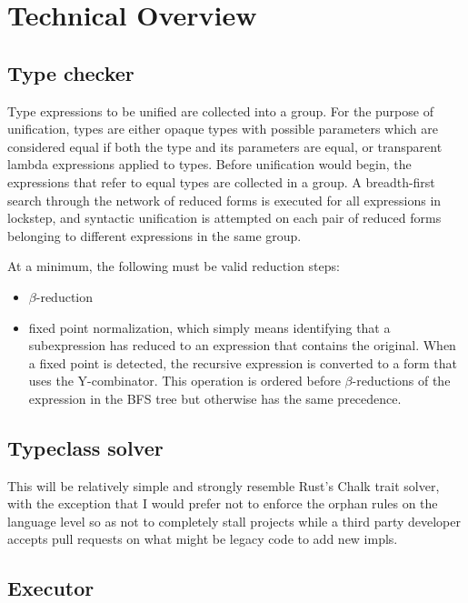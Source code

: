 \documentclass{article}
\begin{document}
\section{Technical Overview}

\subsection{Type checker}

Type expressions to be unified are collected into a group. For the purpose of unification, types
are either opaque types with possible parameters which are considered equal if both the type and its
parameters are equal, or transparent lambda expressions applied to types. Before unification would
begin, the expressions that refer to equal types are collected in a group. A breadth-first search
through the network of reduced forms is executed for all expressions in lockstep, and
syntactic unification is attempted on each pair of reduced forms belonging to different expressions
in the same group.

At a minimum, the following must be valid reduction steps:

\begin{itemize}
  \item $\beta$-reduction
  \item fixed point normalization, which simply means identifying that a subexpression has
    reduced to an expression that contains the original. When a fixed point is detected, the
    recursive expression is converted to a form that uses the Y-combinator. This operation
    is ordered before $\beta$-reductions of the expression in the BFS tree but otherwise has
    the same precedence.
\end{itemize}

\subsection{Typeclass solver}

This will be relatively simple and strongly resemble Rust's Chalk trait solver, with the exception
that I would prefer not to enforce the orphan rules on the language level so as not to completely
stall projects while a third party developer accepts pull requests on what might be legacy code to
add new impls.

\subsection{Executor}
\end{document}
